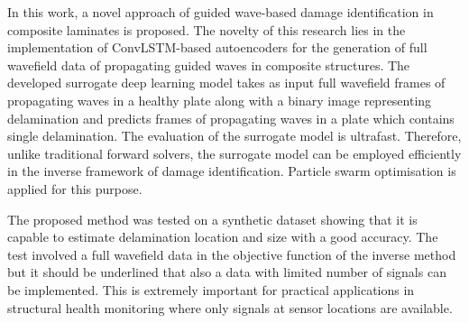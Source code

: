In this work, a novel approach of guided wave-based damage identification in composite laminates is proposed. 
The novelty of this research lies in the implementation of ConvLSTM-based autoencoders for the generation of full wavefield data of propagating guided waves in composite structures.
The developed surrogate deep learning model takes as input full wavefield frames of propagating waves in a healthy plate along with a binary image representing delamination and predicts frames of propagating waves in a plate which contains single delamination.
The evaluation of the surrogate model is ultrafast.
Therefore, unlike traditional forward solvers, the surrogate model can be employed efficiently in the inverse framework of damage identification.
Particle swarm optimisation is applied for this purpose. 

The proposed method was tested on a synthetic dataset showing that it is capable to estimate delamination location and size with a good accuracy.
The test involved a full wavefield data in the objective function of the inverse method but it should be underlined that also a data with limited number of signals can be implemented.
This is extremely important for practical applications in structural health monitoring where only signals at sensor locations are available.